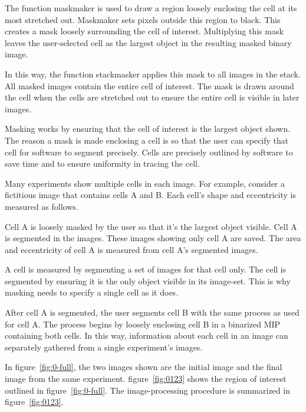 \documentclass[twocolumn,notitlepage]{revtex4-1}
\begin{document}
The function maskmaker is used to draw a region loosely enclosing the cell at its most stretched out. Maskmaker sets pixels outside this region to black. This creates a mask loosely surrounding the cell of interest. Multiplying this mask leaves the user-selected cell as the largest object in the resulting masked binary image.

In this way, the function stackmasker applies this mask to all images in the stack. All masked images contain the entire cell of interest. The mask is drawn around the cell when the cells are stretched out to ensure the entire cell is visible in later images.

Masking works by ensuring that the cell of interest is the largest object shown. The reason a mask is made enclosing a cell is so that the user can specify that cell for software to segment precisely. Cells are precisely outlined by software to save time and to ensure uniformity in tracing the cell.

Many experiments show multiple cells in each image. For example, consider a fictitious image that contains cells A and B. Each cell's shape and eccentricity is measured as follows.

Cell A is loosely masked by the user so that it's the largest object visible. Cell A is segmented in the images. These images showing only cell A are saved. The area and eccentricity of cell A is measured from cell A's segmented images.

A cell is measured by segmenting a set of images for that cell only. The cell is segmented by ensuring it is the only object visible in its image-set. This is why masking needs to specify a single cell as it does.

After cell A is segmented, the user segments cell B with the same process as used for cell A. The process begins by loosely enclosing cell B in a binarized MIP containing both cells. In this way, information about each cell in an image can separately gathered from a single experiment's images.

In figure~\ref{fig:0-full}, the two images shown are the initial image and the final image from the same experiment. figure~\ref{fig:0123} shows the region of interest outlined in figure~\ref{fig:0-full}. The image-processing procedure is summarized in figure~\ref{fig:0123}. 
\end{document}

